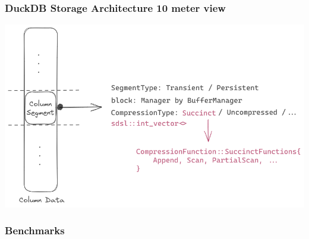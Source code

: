 \documentclass{beamer}
\begin{document}
\begin{frame}
    \frametitle{DuckDB Storage Architecture 10 meter view}
    \includegraphics[width=\framewidth]{figures/excalidraw/duckdb-column-segment-look.png}

\end{frame}


\begin{frame}
    \frametitle{Benchmarks}
\end{frame}
\end{document}
